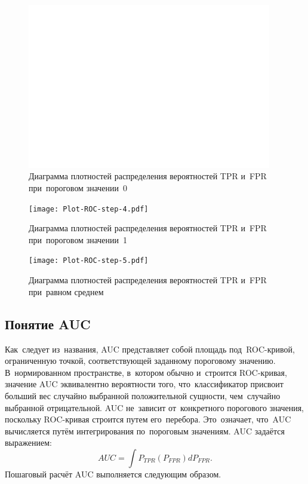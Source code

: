 \documentclass[]{scrreprt}
\begin{document}
\clearpage
%
\begin{figure}[ht]
	\centering
	\includegraphics[width=0.95\textwidth]{Plot-ROC-step-3.pdf}
	\caption{Диаграмма плотностей распределения вероятностей TPR и~FPR при~пороговом значении~0}
	\label{fig:plot-TPR-FPR-prob-density-3}
\end{figure}
%
\begin{figure}[ht]
	\centering
	\texttt{[image: Plot-ROC-step-4.pdf]}
	\caption{Диаграмма плотностей распределения вероятностей TPR и~FPR при~пороговом значении~1}
	\label{fig:plot-TPR-FPR-prob-density-4}
\end{figure}
%
\begin{figure}[ht]
	\centering
	\texttt{[image: Plot-ROC-step-5.pdf]}
	\caption{Диаграмма плотностей распределения вероятностей TPR и~FPR при~равном среднем}
	\label{fig:plot-TPR-FPR-prob-density-5}
\end{figure}
%
\subsection{Понятие AUC}
Как~следует из~названия, AUC представляет собой площадь под~ROC-кривой, ограниченную точкой, соответствующей заданному пороговому значению. В~нормированном пространстве, в~котором обычно и~строится ROC-кривая, значение AUC эквивалентно вероятности того, что~классификатор присвоит больший вес случайно выбранной положительной сущности, чем~случайно выбранной отрицательной. AUC не~зависит от~конкретного порогового значения, поскольку ROC-кривая строится путем его~перебора. Это~означает, что~AUC вычисляется путём интегрирования по~пороговым значениям. AUC задаётся выражением:
\begin{equation}\label{eq:AUC-computation}
AUC = \int P_{TPR}(P_{FPR}) d P_{FPR}.
\end{equation}
Пошаговый расчёт AUC выполняется следующим образом.
%
\end{document}
